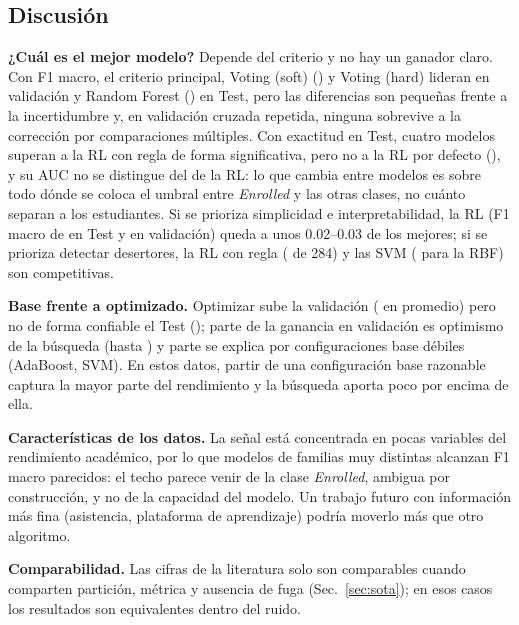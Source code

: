 \documentclass[conference]{IEEEtran}
\newcommand{\cE}{\emph{Enrolled}}
\newcommand{\Fm}{F1 macro}
\begin{document}
\subsection{Discusión}\label{sec:disc}
\textbf{¿Cuál es el mejor modelo?} Depende del criterio y no hay un ganador claro. Con \Fm{}, el criterio principal, Voting (soft) (\cvFVS) y Voting (hard) lideran en validación y Random Forest (\teFRF) en Test, pero las diferencias son pequeñas frente a la incertidumbre y, en validación cruzada repetida, ninguna sobrevive a la corrección por comparaciones múltiples. Con exactitud en Test, cuatro modelos superan a la RL con regla de forma significativa, pero no a la RL por defecto (\accLRD{}), y su AUC no se distingue del de la RL: lo que cambia entre modelos es sobre todo dónde se coloca el umbral entre \cE{} y las otras clases, no cuánto separan a los estudiantes. Si se prioriza simplicidad e interpretabilidad, la RL (\Fm{} de \teFLR{} en Test y \cvFLR{} en validación) queda a unos 0.02--0.03 de los mejores; si se prioriza detectar desertores, la RL con regla (\detLRR{} de 284) y las SVM (\detSVR{} para la RBF) son competitivas.

\textbf{Base frente a optimizado.} Optimizar sube la validación (\dcvMedia{} en promedio) pero no de forma confiable el Test (\dteMedia{}); parte de la ganancia en validación es optimismo de la búsqueda (hasta \optMax{}) y parte se explica por configuraciones base débiles (AdaBoost, SVM). En estos datos, partir de una configuración base razonable captura la mayor parte del rendimiento y la búsqueda aporta poco por encima de ella.

\textbf{Características de los datos.} La señal está concentrada en pocas variables del rendimiento académico, por lo que modelos de familias muy distintas alcanzan \Fm{} parecidos: el techo parece venir de la clase \cE, ambigua por construcción, y no de la capacidad del modelo. Un trabajo futuro con información más fina (asistencia, plataforma de aprendizaje) podría moverlo más que otro algoritmo.

\textbf{Comparabilidad.} Las cifras de la literatura solo son comparables cuando comparten partición, métrica y ausencia de fuga (Sec.~\ref{sec:sota}); en esos casos los resultados son equivalentes dentro del ruido.
\end{document}
